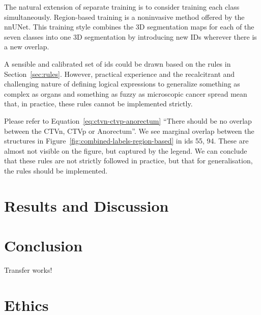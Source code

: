 \documentclass[12pt,twoside]{report}
\begin{document}
The natural extension of separate training is to consider training each class simultaneously. Region-based training is a noninvasive method offered by the nnUNet. This training style combines the 3D segmentation maps for each of the seven classes into one 3D segmentation by introducing new IDs wherever there is a new overlap.

A sensible and calibrated set of ids could be drawn based on the rules in Section~\ref{sec:rules}. However, practical experience and the recalcitrant and challenging nature of defining logical expressions to generalize something as complex as organs and something as fuzzy as microscopic cancer spread mean that, in practice, these rules cannot be implemented strictly.

Please refer to Equation~\ref{eq:ctvn-ctvp-anorectum} ``There should be no overlap between the CTVn, CTVp or Anorectum''. We see marginal overlap between the structures in Figure~\ref{fig:combined-labels-region-based} in ids 55, 94. These are almost not visible on the figure, but captured by the legend. We can conclude that these rules are not strictly followed in practice, but that for generalisation, the rules should be implemented.



\chapter{Results and Discussion}\label{sect:results}\label{sect:discussion}




\chapter{Conclusion}

Transfer works!


\chapter{Ethics}
\end{document}
